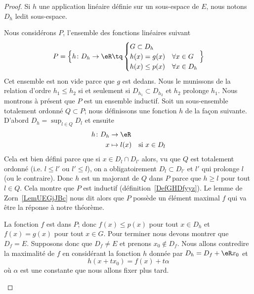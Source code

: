 	\begin{proof}
		Si \( h\) une application linéaire définie sur un sous-espace de \( E\), nous notons \( D_h\) ledit sous-espace.

		\begin{subproof}

			Nous considérons \( P\), l'ensemble des fonctions linéaires suivant
			\begin{equation}
				P=\Big\{  h\colon D_h\to \eR\tq
				\begin{cases}
					G\subset D_h                     \\
					h(x)=g(x)     & \forall x\in G   \\
					h(x)\leq p(x) & \forall x\in D_h
				\end{cases}
				\Big\}
			\end{equation}
			Cet ensemble est non vide parce que \( g\) est dedans. Nous le munissons de la relation d'ordre \( h_1\leq h_2\) si et seulement si \( D_{h_1}\subset D_{h_2}\) et \( h_2\) prolonge \( h_1\). Nous montrons à présent que \( P\) est un ensemble inductif. Soit un sous-ensemble totalement ordonné \( Q\subset P\); nous définissons une fonction \( h\) de la façon suivante. D'abord \( D_h=\sup_{l\in Q}D_l\) et ensuite
			\begin{equation}
				\begin{aligned}
					h\colon D_h & \to \eR                            \\
					x           & \mapsto l(x) & \text{si } x\in D_l
				\end{aligned}
			\end{equation}
			Cela est bien défini parce que si \( x\in D_l\cap D_{l'}\) alors, vu que \( Q\) est totalement ordonné (i.e. \( l\leq l'\) ou \( l'\leq l\)), on a obligatoirement \( D_l\subset D_{l'}\) et \( l'\) qui prolonge \( l\) (ou le contraire). Donc \( h\) est un majorant de \( Q\) dans \( P\) parce que \( h\geq l\) pour tout \( l\in Q\). Cela montre que \( P\) est inductif (définition~\ref{DefGHDfyyz}). Le lemme de Zorn~\ref{LemUEGjJBc} nous dit alors que \( P\) possède un élément maximal \( f\) qui va être la réponse à notre théorème.

			\spitem[Le support de \( f\)]

			La fonction \( f\) est dans \( P\); donc \( f(x)\leq p(x)\) pour tout \( x\in D_h\) et \( f(x)=g(x)\) pour tout \( x\in G\). Pour terminer nous devons montrer que \( D_f=E\). Supposons donc que \( D_f\neq E\) et prenons \( x_0\notin D_f\). Nous allons contredire la maximalité de \( f\) en considérant la fonction \( h\) donnée par \( D_h=D_f+\eR x_0 \) et
			\begin{equation}
				h(x+tx_0)=f(x)+t\alpha
			\end{equation}
			où \( \alpha\) est une constante que nous allons fixer plus tard.


\end{subproof}
\end{proof}
